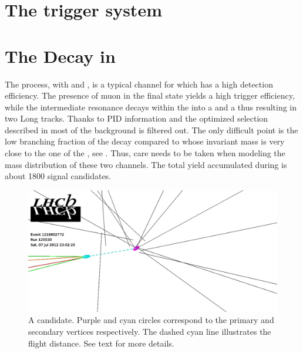 \section{The trigger system}
\label{det_trigger}


\section{The \BsJpsiKst Decay in \lhcb}
\label{BspsiKst_at_lhcb}


The \BsJpsiKst process, with \Jpsimumu and \KstKpi, is a typical channel for which \lhcb has a high detection efficiency.
The presence of muon in the final state yields a high trigger efficiency, while the intermediate
\Kstarz resonance decays within the \velo into a \Kp and a \pim thus resulting in two Long tracks.
Thanks to PID information and the optimized selection described in  most of the background
is filtered out. The only difficult point is the low branching fraction of the \BsJpsiKst decay
compared to \BdJpsiKst whose invariant mass is very close to the one of the \BsJpsiKst, see .
Thus, care needs to be taken when modeling the mass distribution of these two channels.
The total \BsJpsiKst yield accumulated during \runone is about 1800 signal candidates.

\begin{figure}[t]
  \centering
 \includegraphics[width=\textwidth,trim=0cm 3cm 17cm 0cm, clip=true]{Figures/Chapter2/jpsikst_event}
  \caption{A \BsJpsiKst candidate. Purple and cyan circles correspond to the primary and secondary
           vertices respectively. The dashed cyan line illustrates the \Bs flight distance.
          See text for more details.}
  \label{det_jpsikst_cand}
\end{figure}

